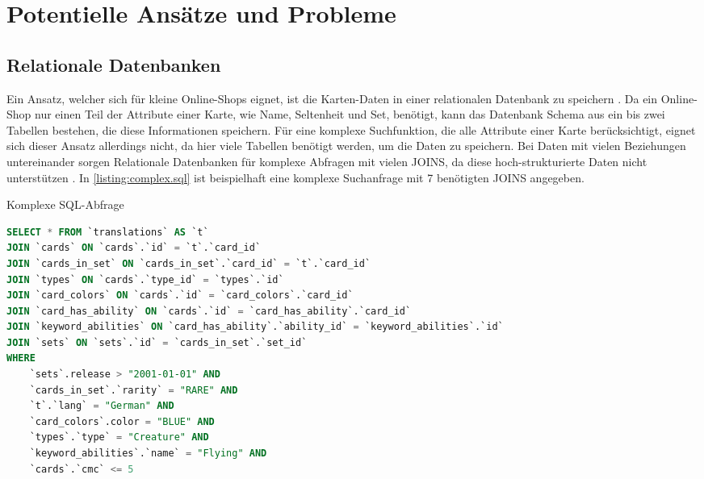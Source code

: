 \section{Potentielle Ansätze und Probleme}\label{ch:ansaetze-probleme}

\subsection{Relationale Datenbanken}

Ein Ansatz, welcher sich für kleine Online-Shops eignet, ist die Karten-Daten in einer relationalen Datenbank zu speichern \cite{johnson2013online}. Da ein Online-Shop nur einen Teil der Attribute einer Karte, wie Name, Seltenheit und Set, benötigt, kann das Datenbank Schema aus ein bis zwei Tabellen bestehen, die diese Informationen speichern. Für eine komplexe Suchfunktion, die alle Attribute einer Karte berücksichtigt, eignet sich dieser Ansatz allerdings nicht, da hier viele Tabellen benötigt werden, um die Daten zu speichern. Bei Daten mit vielen Beziehungen untereinander sorgen Relationale Datenbanken für komplexe Abfragen mit vielen JOINS, da diese hoch-strukturierte Daten nicht unterstützen \cite{robinsongraph:2015}. In \autoref{listing:complex.sql} ist beispielhaft eine komplexe Suchanfrage mit 7 benötigten JOINS angegeben.

\begin{listing}[H]
    \caption{Komplexe SQL-Abfrage}
    \label{listing:complex.sql}
    \begin{lstlisting}[language=SQL]
SELECT * FROM `translations` AS `t` 
JOIN `cards` ON `cards`.`id` = `t`.`card_id`
JOIN `cards_in_set` ON `cards_in_set`.`card_id` = `t`.`card_id`
JOIN `types` ON `cards`.`type_id` = `types`.`id`
JOIN `card_colors` ON `cards`.`id` = `card_colors`.`card_id`
JOIN `card_has_ability` ON `cards`.`id` = `card_has_ability`.`card_id`
JOIN `keyword_abilities` ON `card_has_ability`.`ability_id` = `keyword_abilities`.`id`
JOIN `sets` ON `sets`.`id` = `cards_in_set`.`set_id`
WHERE
    `sets`.release > "2001-01-01" AND
    `cards_in_set`.`rarity` = "RARE" AND
    `t`.`lang` = "German" AND
    `card_colors`.color = "BLUE" AND
    `types`.`type` = "Creature" AND
    `keyword_abilities`.`name` = "Flying" AND
    `cards`.`cmc` <= 5
    \end{lstlisting}
\end{listing}


